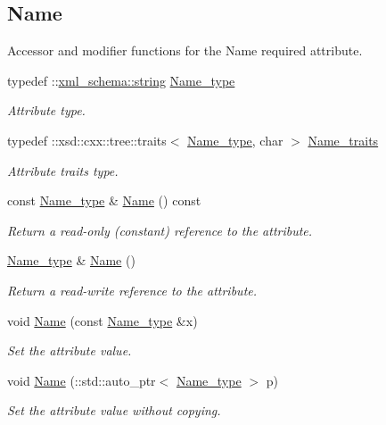 \subsection*{Name}
\label{_amgrp49ee3087348e8d44e1feda1917443987}%
Accessor and modifier functions for the Name required attribute. \begin{DoxyCompactItemize}
\item 
typedef \+::\hyperlink{namespacexml__schema_aefbaf353f9a0043af46d23d9040ef268}{xml\+\_\+schema\+::string} \hyperlink{classDataArray__t_afc6836923916c2489f91caea78ec4ad6}{Name\+\_\+type}
\begin{DoxyCompactList}\small\item\em Attribute type. \end{DoxyCompactList}\item 
typedef \+::xsd\+::cxx\+::tree\+::traits$<$ \hyperlink{classDataArray__t_afc6836923916c2489f91caea78ec4ad6}{Name\+\_\+type}, char $>$ \hyperlink{classDataArray__t_a46d0b4cf44ee9122e4cbb3bd3abe6663}{Name\+\_\+traits}
\begin{DoxyCompactList}\small\item\em Attribute traits type. \end{DoxyCompactList}\item 
const \hyperlink{classDataArray__t_afc6836923916c2489f91caea78ec4ad6}{Name\+\_\+type} \& \hyperlink{classDataArray__t_ada03ebff820f73d64d0761a0fb977527}{Name} () const 
\begin{DoxyCompactList}\small\item\em Return a read-\/only (constant) reference to the attribute. \end{DoxyCompactList}\item 
\hyperlink{classDataArray__t_afc6836923916c2489f91caea78ec4ad6}{Name\+\_\+type} \& \hyperlink{classDataArray__t_aeb126f8a8b03eea44eed5a2b606da59c}{Name} ()
\begin{DoxyCompactList}\small\item\em Return a read-\/write reference to the attribute. \end{DoxyCompactList}\item 
void \hyperlink{classDataArray__t_a95a1f49a6dd9f54fb71fb6b70240a51b}{Name} (const \hyperlink{classDataArray__t_afc6836923916c2489f91caea78ec4ad6}{Name\+\_\+type} \&x)
\begin{DoxyCompactList}\small\item\em Set the attribute value. \end{DoxyCompactList}\item 
void \hyperlink{classDataArray__t_a290f1b5702b7a623a0c9fc086a7a0d0c}{Name} (\+::std\+::auto\+\_\+ptr$<$ \hyperlink{classDataArray__t_afc6836923916c2489f91caea78ec4ad6}{Name\+\_\+type} $>$ p)
\begin{DoxyCompactList}\small\item\em Set the attribute value without copying. \end{DoxyCompactList}\end{DoxyCompactItemize}
